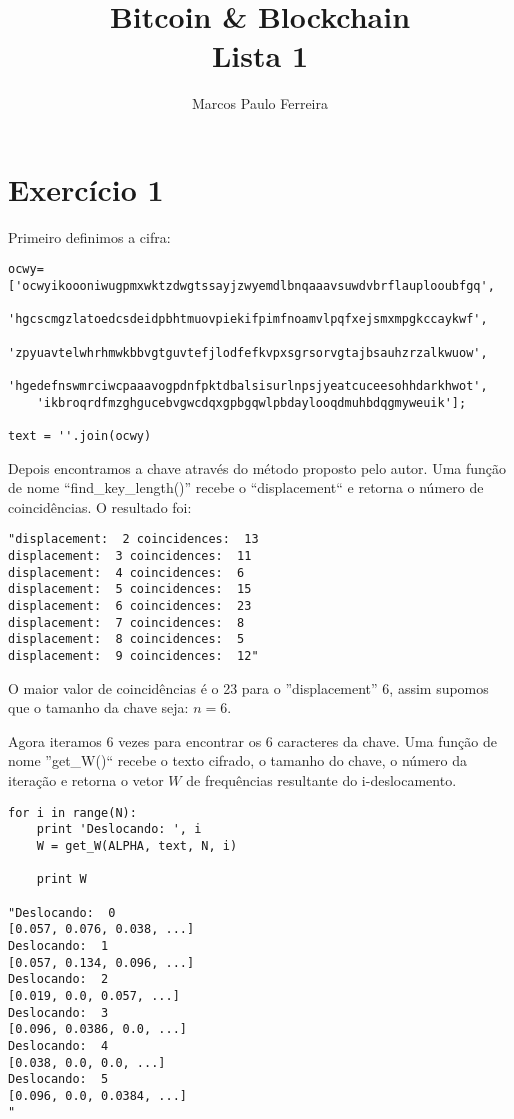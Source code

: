 \documentclass[a4paper]{article}
\begin{document}
\title{%
  Bitcoin \& Blockchain \\
  \large {Lista 1}
}
    
\author{Marcos Paulo Ferreira}

\maketitle

\section{Exercício 1}\label{sec:Ex1}

Primeiro definimos a cifra:

\begin{lstlisting}
ocwy=['ocwyikoooniwugpmxwktzdwgtssayjzwyemdlbnqaaavsuwdvbrflauplooubfgq',
    'hgcscmgzlatoedcsdeidpbhtmuovpiekifpimfnoamvlpqfxejsmxmpgkccaykwf',
    'zpyuavtelwhrhmwkbbvgtguvtefjlodfefkvpxsgrsorvgtajbsauhzrzalkwuow',
    'hgedefnswmrciwcpaaavogpdnfpktdbalsisurlnpsjyeatcuceesohhdarkhwot',
    'ikbroqrdfmzghgucebvgwcdqxgpbgqwlpbdaylooqdmuhbdqgmyweuik'];

text = ''.join(ocwy)  
\end{lstlisting}

Depois encontramos a chave através do método proposto pelo autor. Uma função de nome ``find\_key\_length()'' recebe o
``displacement`` e retorna o número de coincidências. O resultado foi:

\begin{lstlisting}
"displacement:  2 coincidences:  13
displacement:  3 coincidences:  11
displacement:  4 coincidences:  6
displacement:  5 coincidences:  15
displacement:  6 coincidences:  23
displacement:  7 coincidences:  8
displacement:  8 coincidences:  5
displacement:  9 coincidences:  12"
\end{lstlisting}

O maior valor de coincidências é o 23 para o ''displacement'' 6, assim supomos que o tamanho da chave seja: $n = 6$.

Agora iteramos 6 vezes para encontrar os 6 caracteres da chave. Uma função de nome ''get\_W()`` recebe o texto cifrado,
o tamanho do chave, o número da iteração e retorna o vetor $W$ de frequências resultante do i-deslocamento.

\begin{lstlisting}
for i in range(N):
    print 'Deslocando: ', i
    W = get_W(ALPHA, text, N, i)
    
    print W
    
"Deslocando:  0
[0.057, 0.076, 0.038, ...]
Deslocando:  1
[0.057, 0.134, 0.096, ...]
Deslocando:  2
[0.019, 0.0, 0.057, ...]
Deslocando:  3
[0.096, 0.0386, 0.0, ...]
Deslocando:  4
[0.038, 0.0, 0.0, ...]
Deslocando:  5
[0.096, 0.0, 0.0384, ...]
"
\end{lstlisting}
\end{document}
